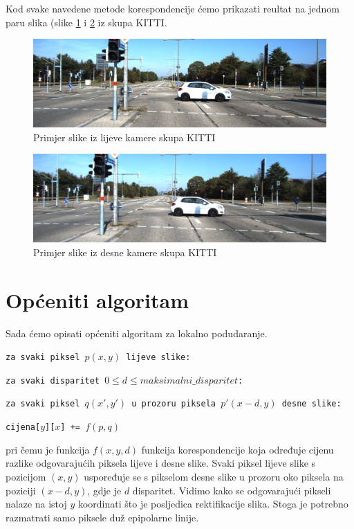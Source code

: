 \documentclass[utf8, zavrsni, numeric]{fer}
\begin{document}
Kod svake navedene metode korespondencije ćemo prikazati reultat na jednom paru slika (slike \ref{fig:lijeva_KITTI} i \ref{fig:desna_KITTI} iz skupa KITTI.

\begin{figure}[htb]
  \centering
  \includegraphics[width=14cm]{img/000046_10_2.png}
  \caption{Primjer slike iz lijeve kamere skupa KITTI}
  \label{fig:lijeva_KITTI}
\end{figure}

\begin{figure}[htb]
  \centering
  \includegraphics[width=14cm]{img/000046_10_3.png}
  \caption{Primjer slike iz desne kamere skupa KITTI}
  \label{fig:desna_KITTI}
\end{figure}

\section{Općeniti algoritam}
Sada ćemo opisati općeniti algoritam za lokalno podudaranje.

{\tt za svaki piksel $p(x, y)$ lijeve slike:}

{\quad \tt za svaki disparitet $0 \leq d \leq maksimalni\_ disparitet$:}

{\quad\quad\tt za svaki piksel $q(x', y')$ u prozoru piksela $p'(x - d, y)$ desne slike:}

{\quad\quad\quad \tt cijena[$y$][$x$] += $f(p, q)$}    


\noindent pri čemu je funkcija $f(x, y, d)$ funkcija korespondencije koja određuje cijenu razlike odgovarajućih piksela lijeve i desne slike. Svaki piksel lijeve slike s pozicijom $(x, y)$
uspoređuje se s pikselom desne slike u prozoru oko piksela na poziciji $(x - d, y)$, gdje je $d$ disparitet. Vidimo kako se odgovarajući pikseli nalaze na istoj $y$ koordinati što je posljedica rektifikacije slika.
Stoga je potrebno razmatrati samo piksele duž epipolarne linije.
\end{document}
